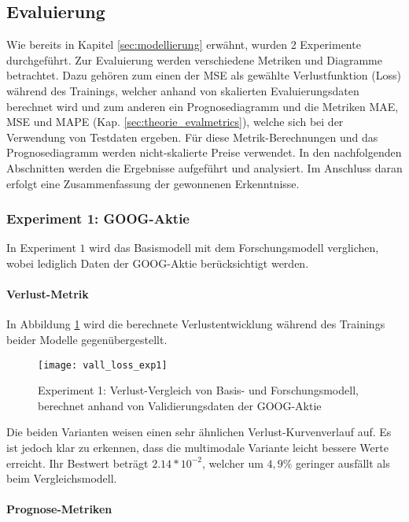\newpage
\subsection{Evaluierung}\label{sec:evaluierung}

Wie bereits in Kapitel \ref{sec:modellierung} erwähnt, wurden 2 Experimente durchgeführt. Zur Evaluierung werden verschiedene Metriken und Diagramme betrachtet. Dazu gehören zum einen der \ac{MSE} als gewählte Verlustfunktion (Loss) während des Trainings, welcher anhand von skalierten Evaluierungsdaten berechnet wird und zum anderen ein Prognosediagramm und die Metriken \ac{MAE}, \ac{MSE} und \ac{MAPE} (Kap. \ref{sec:theorie_evalmetrics}), welche sich bei der Verwendung von Testdaten ergeben. Für diese Metrik-Berechnungen und das Prognosediagramm werden nicht-skalierte Preise verwendet.
In den nachfolgenden Abschnitten werden die Ergebnisse aufgeführt und analysiert. Im Anschluss daran erfolgt eine Zusammenfassung der gewonnenen Erkenntnisse. 

\subsubsection{Experiment 1: GOOG-Aktie}\label{sec:evaluierung_exp1}
In Experiment $1$ wird das Basismodell mit dem Forschungsmodell verglichen, wobei lediglich Daten der GOOG-Aktie berücksichtigt werden. 

\paragraph*{Verlust-Metrik} 

In Abbildung \ref{fig:vall_loss_exp1} wird die berechnete Verlustentwicklung während des Trainings beider Modelle gegenübergestellt.
\begin{figure}[H]
	\texttt{[image: vall\_loss\_exp1]}
	\caption{Experiment 1: Verlust-Vergleich von Basis- und Forschungsmodell, berechnet anhand von Validierungsdaten der GOOG-Aktie}
	\label{fig:vall_loss_exp1}
\end{figure}
Die beiden Varianten weisen einen sehr ähnlichen Verlust-Kurvenverlauf auf. Es ist jedoch klar zu erkennen, dass die multimodale Variante leicht bessere Werte erreicht. Ihr Bestwert beträgt $2.14*10^{-2}$, welcher um $4,9\%$ geringer ausfällt als beim Vergleichsmodell.

\paragraph*{Prognose-Metriken} 

